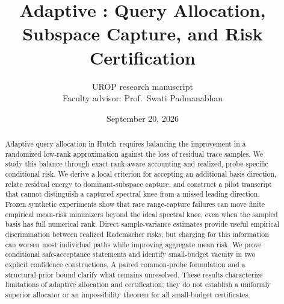 \documentclass[11pt,letterpaper]{article}
\title{Adaptive \hutchpp: Query Allocation,\\Subspace Capture, and Risk Certification}
\author{UROP research manuscript\\
 \small Faculty advisor: Prof.\ Swati Padmanabhan}
\date{September 20, 2026}
\theoremstyle{definition}
\theoremstyle{remark}
\numberwithin{equation}{section}
\newcommand{\hutchpp}{Hutch\raisebox{.35ex}{\scriptsize++}}
\begin{document}
\maketitle
\begin{abstract}
Adaptive query allocation in \hutchpp\ requires balancing the improvement in a
randomized low-rank approximation against the loss of residual trace samples.
We study this balance through exact rank-aware accounting and realized,
probe-specific conditional risk. We derive a local criterion for accepting an
additional basis direction, relate residual energy to dominant-subspace
capture, and construct a pilot transcript that cannot distinguish a captured
spectral knee from a missed leading direction. Frozen synthetic experiments
show that rare range-capture failures can move finite empirical mean-risk
minimizers beyond the ideal spectral knee, even when the sampled basis has
full numerical rank. Direct sample-variance estimates provide useful
empirical discrimination between realized Rademacher risks, but charging for
this information can worsen most individual paths while improving aggregate
mean risk. We prove conditional safe-acceptance statements and identify
small-budget vacuity in two explicit confidence constructions. A paired
common-probe formulation and a structural-prior bound clarify what remains
unresolved. These results characterize limitations of adaptive allocation
and certification; they do not establish a uniformly superior allocator or
an impossibility theorem for all small-budget certificates.
\end{abstract}












\clearpage
\appendix


\end{document}
